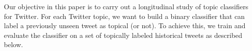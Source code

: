 Our objective in this paper is to carry out a longitudinal study of topic classifiers for Twitter.  
%
%
%
%
% 
For each Twitter topic, we want to build a binary classifier that can label
a previously unseen tweet as topical (or not).  To achieve this, we 
train and evaluate the classifier on a set of topically labeled historical tweets as described below.


